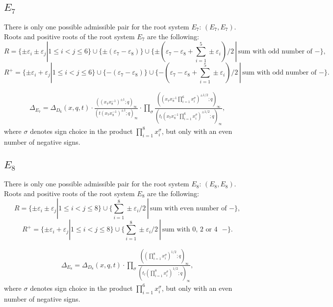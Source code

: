 \documentclass{article}
\def\ep{\varepsilon}
\begin{document}
\subsection*{$E_7$}
There is only one possible admissible pair for the root system $E_7$: $(E_7,E_7)$. Roots and positive roots of the root system $E_7$ are the following:
\begin{equation}
    R= \{\pm \ep_i \pm \ep_j | 1\leq i<j\leq 6\}\cup \{\pm (\ep_7-\ep_8)\} \cup \{\pm( \ep_7 - \ep_8 + \sum_{i=1}^5 \pm \ep_i)/2 \,|\, \text{sum with odd number of }-\},
\end{equation}
\begin{equation}
    R^{+}= \{\pm \ep_i + \ep_j | 1\leq i<j\leq 6\}\cup \{ -(\ep_7-\ep_8)\} \cup \{-( \ep_7 - \ep_8 + \sum_{i=1}^5 \pm \ep_i)/2 \,|\, \text{sum with odd number of }-\}.
\end{equation}

\begin{align}
    \Delta_{E_7} = \Delta_{D_{6}}(x,q,t) \cdot \frac{((x_7x_8^{-1})^{\pm 1};q)_{\infty}}{(t(x_7x_8^{-1})^{\pm 1};q)_{\infty}}\cdot \prod_{\sigma}\frac{((x_7 x_8^{-1}\prod^{6}_{i=1}x_i^{\sigma})^{\pm 1/2};q)_{\infty}}{(t_l(x_7 x_8^{-1}\prod^{6}_{i=1} x_i^{\sigma})^{\pm 1/2};q)_{\infty}},
\end{align}
where $\sigma$ denotes sign choice in the product $\prod^{8}_{i=1}x_i^{\sigma}$, but only with an even number of negative signs.

\subsection*{$E_8$}
There is only one possible admissible pair for the root system $E_8$: $(E_8,E_8)$. Roots and positive roots of the root system $E_8$ are the following:
\begin{equation}
    R= \{\pm \ep_i \pm \ep_j | 1\leq i<j\leq 8\}\cup \{ \sum_{i=1}^{8}\pm \ep_i / 2 \,|\, \text{sum with even number of }-\},
\end{equation}
\begin{equation}
    R^+= \{\pm \ep_i + \ep_j | 1\leq i<j\leq 8\}\cup \{ \sum_{i=1}^{8}\pm \ep_i / 2 \,|\, \text{sum with $0$, $2$ or $4$ } - \}.
\end{equation}

\begin{align}
    \Delta_{E_8} = \Delta_{D_8}(x,q,t)\cdot \prod_{\sigma} \frac{((\prod_{i=1}^{8} x_i^{\sigma})^{ 1/2};q)_{\infty}}{(t_
    l(\prod_{i=1}^{8} x_i^{\sigma})^{1/2};q)_{\infty}},
\end{align}
where $\sigma$ denotes sign choice in the product $\prod^{6}_{i=1}x_i^{\sigma}$, but only with an even number of negative signs.
\end{document}
